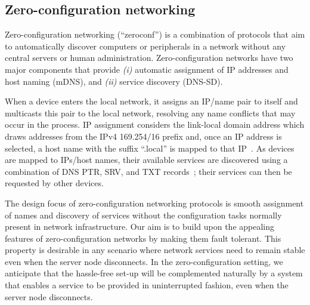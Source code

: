 \subsection{Zero-configuration networking}
\label{sec:zeroconf}

Zero-configuration networking (``zeroconf'') is a combination of protocols that aim to automatically discover computers or peripherals in a network without any central servers or human administration. Zero-configuration networks have two major components that provide {\it (i)} automatic assignment of IP addresses and host naming (mDNS), and {\it (ii)} service discovery (DNS-SD).

When a device enters the local network, it assigns an IP/name pair to itself and  multicasts this pair to the local network, resolving any name conflicts that may occur in the process. IP assignment considers the link-local domain address which draws addresses from the IPv4 169.254/16 prefix and, once an IP address is selected, a host name with the suffix ``.local'' is mapped to that IP~\cite{rfc6762}. As devices are mapped to IPs/host names, their available services are discovered using a combination of DNS PTR, SRV, and TXT records~\cite{rfc6763}; their services can then be requested by other devices.

The design focus of zero-configuration networking protocols is smooth assignment of names and discovery of services without the configuration tasks normally present in network infrastructure. 
Our aim is to build upon the appealing features of zero-configuration networks by making them fault tolerant.
This property is desirable in any scenario where network services need to remain stable even when the server node disconnects.
In the zero-configuration setting, we anticipate that the hassle-free set-up will be complemented naturally by a system that enables a service to be provided in uninterrupted fashion, even when the server node disconnects.

